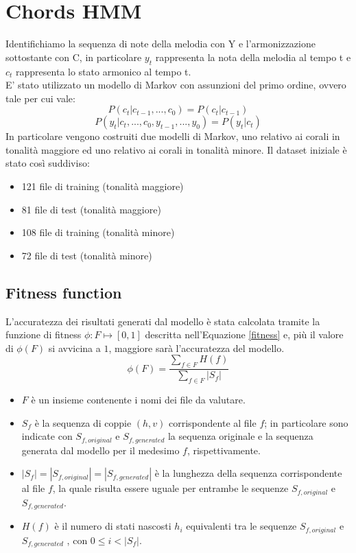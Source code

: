 \chapter{Chords HMM}\label{ch:hmm-chords}
Identifichiamo la sequenza di note della melodia con Y e l'armonizzazione sottostante con C, in particolare $y_t$ rappresenta la nota della melodia al tempo t e $c_t$ rappresenta lo stato armonico al tempo t. \\
E' stato utilizzato un modello di Markov con assunzioni del primo ordine, ovvero tale per cui vale:
\begin{equation}
P(c_t|c_{t-1},...,c_0) = P(c_t|c_{t-1})
\end{equation}
\begin{equation}
P(y_t|c_t,...,c_0,y_{t-1},...,y_0) = P(y_t|c_t)
\end{equation}
In particolare vengono costruiti due modelli di Markov, uno relativo ai corali in tonalità maggiore ed uno relativo ai corali in tonalità minore.
Il dataset iniziale è stato così suddiviso:
\begin{itemize}
\item 121 file di training (tonalità maggiore)
\item 81 file di test (tonalità maggiore)
\item 108 file di training (tonalità minore)
\item 72 file di test (tonalità minore)
\end{itemize}
\section{Fitness function}
L'accuratezza dei risultati generati dal modello è stata calcolata tramite la funzione di fitness $\phi: F \mapsto [0, 1]$ descritta nell'Equazione \ref{fitness} e, più il valore di $\phi(F)$ si avvicina a $1$, maggiore sarà l'accuratezza del modello.
\begin{equation}\label{fitness}
\phi(F)=\frac{\sum_{f \in F} H(f)}{\sum_{f \in F} |S_f|}
\end{equation}
\begin{itemize}
	\item $F$ è un insieme contenente i nomi dei file da valutare.
	\item $S_f$ è la sequenza di coppie $(h, v)$ corrispondente al file $f$; in particolare sono indicate con $S_{f,original}$ e $S_{f,generated}$ la sequenza originale e la sequenza generata dal modello per il medesimo $f$, rispettivamente.
	\item $|S_f| = |S_{f,original}| = |S_{f,generated}|$ è la lunghezza della sequenza corrispondente al file $f$, la quale risulta essere uguale per entrambe le sequenze $S_{f,original}$ e $S_{f,generated}$.
	\item $H(f)$ è il numero di stati nascosti $h_i$ equivalenti tra le sequenze $S_{f,original}$ e $S_{f,generated}$ , con $0 \leqslant i < |S_f|$.
\end{itemize}
